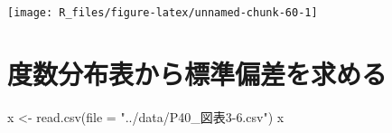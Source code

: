 \documentclass[
  12pt,
]{book}
\newenvironment{Shaded}{\begin{snugshade}}{\end{snugshade}}
\newcommand{\AttributeTok}[1]{\textcolor[rgb]{0.77,0.63,0.00}{#1}}
\newcommand{\DecValTok}[1]{\textcolor[rgb]{0.00,0.00,0.81}{#1}}
\newcommand{\FloatTok}[1]{\textcolor[rgb]{0.00,0.00,0.81}{#1}}
\newcommand{\FunctionTok}[1]{\textcolor[rgb]{0.00,0.00,0.00}{#1}}
\newcommand{\NormalTok}[1]{#1}
\newcommand{\OtherTok}[1]{\textcolor[rgb]{0.56,0.35,0.01}{#1}}
\newcommand{\SpecialCharTok}[1]{\textcolor[rgb]{0.00,0.00,0.00}{#1}}
\newcommand{\StringTok}[1]{\textcolor[rgb]{0.31,0.60,0.02}{#1}}
\begin{document}
\begin{Shaded}
\end{Shaded}

\begin{center}\texttt{[image: R\_files/figure-latex/unnamed-chunk-60-1]} \end{center}

\hypertarget{ux5ea6ux6570ux5206ux5e03ux8868ux304bux3089ux6a19ux6e96ux504fux5deeux3092ux6c42ux3081ux308b}{%
\section{度数分布表から標準偏差を求める}\label{ux5ea6ux6570ux5206ux5e03ux8868ux304bux3089ux6a19ux6e96ux504fux5deeux3092ux6c42ux3081ux308b}}

\begin{Shaded}
\begin{Highlighting}[]
\NormalTok{x }\OtherTok{\textless{}{-}} \FunctionTok{read.csv}\NormalTok{(}\AttributeTok{file =} \StringTok{"../data/P40\_図表3{-}6.csv"}\NormalTok{)}
\NormalTok{x}
\end{Highlighting}
\end{Shaded}
\end{document}
